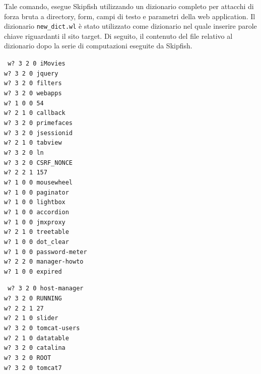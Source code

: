 \documentclass{article}
\begin{document}
\begin{itemize}
Tale comando, esegue Skipfish utilizzando un dizionario completo per attacchi di forza bruta a directory, form, campi di testo e parametri della web application.
Il dizionario {\tt new\_dict.wl} è stato utilizzato come dizionario nel quale inserire parole chiave riguardanti il sito target. Di seguito, il contenuto del file relativo al dizionario dopo la serie di computazioni eseguite da Skipfish.
\begin{small}
\begin{minipage}{0.47\textwidth}
\tt
w? 3 2 0 iMovies\\
w? 3 2 0 jquery\\
w? 3 2 0 filters\\
w? 3 2 0 webapps\\
w? 1 0 0 54\\
w? 2 1 0 callback\\
w? 3 2 0 primefaces\\
w? 3 2 0 jsessionid\\
w? 2 1 0 tabview\\
w? 3 2 0 ln\\
w? 3 2 0 CSRF\_NONCE\\
w? 2 2 1 157\\
w? 1 0 0 mousewheel\\
w? 1 0 0 paginator\\
w? 1 0 0 lightbox\\
w? 1 0 0 accordion\\
w? 1 0 0 jmxproxy\\
w? 2 1 0 treetable\\
w? 1 0 0 dot\_clear\\
w? 1 0 0 password-meter\\
w? 2 2 0 manager-howto\\
w? 1 0 0 expired\\
\end{minipage}
\begin{minipage}{0.47\textwidth}
\tt
w? 3 2 0 host-manager\\
w? 3 2 0 RUNNING\\
w? 2 2 1 27\\
w? 2 1 0 slider\\
w? 3 2 0 tomcat-users\\
w? 2 1 0 datatable\\
w? 3 2 0 catalina\\
w? 3 2 0 ROOT\\
w? 3 2 0 tomcat7\\

\end{minipage}
\end{small}
\end{itemize}
\end{document}
